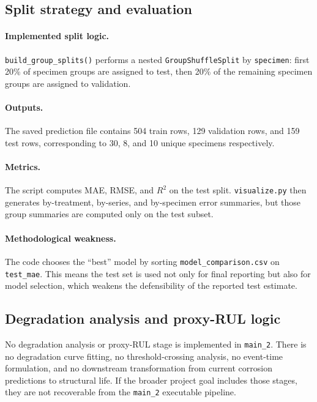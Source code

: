 \documentclass[11pt]{article}
\begin{document}
\subsection{Split strategy and evaluation}
\paragraph{Implemented split logic.}
\texttt{build\_group\_splits()} performs a nested \texttt{GroupShuffleSplit} by \texttt{specimen}: first 20\% of specimen groups are assigned to test, then 20\% of the remaining specimen groups are assigned to validation.

\paragraph{Outputs.}
The saved prediction file contains 504 train rows, 129 validation rows, and 159 test rows, corresponding to 30, 8, and 10 unique specimens respectively.

\paragraph{Metrics.}
The script computes MAE, RMSE, and \(R^2\) on the test split. \texttt{visualize.py} then generates by-treatment, by-series, and by-specimen error summaries, but those group summaries are computed only on the test subset.

\paragraph{Methodological weakness.}
The code chooses the ``best'' model by sorting \texttt{model\_comparison.csv} on \texttt{test\_mae}. This means the test set is used not only for final reporting but also for model selection, which weakens the defensibility of the reported test estimate.

\subsection{Degradation analysis and proxy-RUL logic}
No degradation analysis or proxy-RUL stage is implemented in \texttt{main\_2}. There is no degradation curve fitting, no threshold-crossing analysis, no event-time formulation, and no downstream transformation from current corrosion predictions to structural life. If the broader project goal includes those stages, they are not recoverable from the \texttt{main\_2} executable pipeline.
\end{document}
